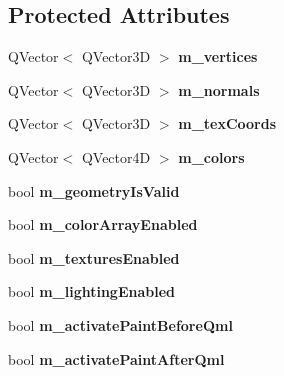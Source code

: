 \subsection*{Protected Attributes}
\begin{DoxyCompactItemize}
\item 
\mbox{\label{class_g_l_item_acf6802c6d50a16ff8fbb0b0b1413dcc8}} 
Q\+Vector$<$ Q\+Vector3D $>$ {\bfseries m\+\_\+vertices}
\item 
\mbox{\label{class_g_l_item_ab36af5032ab015c92a55fbed02c40c4d}} 
Q\+Vector$<$ Q\+Vector3D $>$ {\bfseries m\+\_\+normals}
\item 
\mbox{\label{class_g_l_item_a4b1e91a116668252bb1c099ddb2ccc3a}} 
Q\+Vector$<$ Q\+Vector3D $>$ {\bfseries m\+\_\+tex\+Coords}
\item 
\mbox{\label{class_g_l_item_aeb7650aa679d0b95cc3bb99e9bf220fc}} 
Q\+Vector$<$ Q\+Vector4D $>$ {\bfseries m\+\_\+colors}
\item 
\mbox{\label{class_g_l_item_ac9a158bb5880321e7777a64fdc4c69a9}} 
bool {\bfseries m\+\_\+geometry\+Is\+Valid}
\item 
\mbox{\label{class_g_l_item_a57b8c3fa334a8322c4d040532eb51aef}} 
bool {\bfseries m\+\_\+color\+Array\+Enabled}
\item 
\mbox{\label{class_g_l_item_a75f48d9e816ab64f6f2e4025c690b9b8}} 
bool {\bfseries m\+\_\+textures\+Enabled}
\item 
\mbox{\label{class_g_l_item_ad8770dd7051138df6a0da7b412254e34}} 
bool {\bfseries m\+\_\+lighting\+Enabled}
\item 
\mbox{\label{class_g_l_item_a6034466c7a88892138e14294876144b7}} 
bool {\bfseries m\+\_\+activate\+Paint\+Before\+Qml}
\item 
\mbox{\label{class_g_l_item_a077f0ece18caae8fa8a16ba36c51cac9}} 
bool {\bfseries m\+\_\+activate\+Paint\+After\+Qml}
\item 
\mbox{\label{class_g_l_item_a7ff6af05a375bac0cc2cc9333595de43}} 

\end{DoxyCompactItemize}
